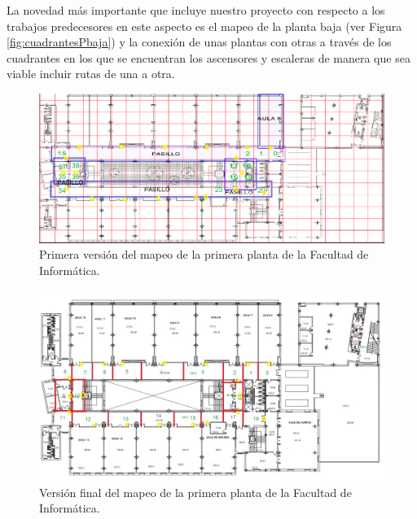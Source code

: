 La novedad más importante que incluye nuestro proyecto con respecto a los trabajos predecesores en este aspecto es el mapeo de la planta baja (ver Figura \ref{fig:cuadrantesPbaja}) y la conexión de unas plantas con otras a través de los cuadrantes en los que se encuentran los ascensores y escaleras de manera que sea viable incluir rutas de una a otra.

\begin{figure}[t]
	\centering
	\includegraphics[width=1\textwidth]{Imagenes/Descripciondeltrabajo/mapaplanta1_cuadrantes}
	\caption{Primera versión del mapeo de la primera planta de la Facultad de Informática.}
	\label{fig:cuadrantesP1_v1}
\end{figure}

\begin{figure}[t]
	\centering
	\includegraphics[width=1\textwidth]{Imagenes/Descripciondeltrabajo/mapaplanta1_cuadrantes3}
	\caption{Versión final del mapeo de la primera planta de la Facultad de Informática.}
	\label{fig:cuadrantesP1_v3}
\end{figure}

